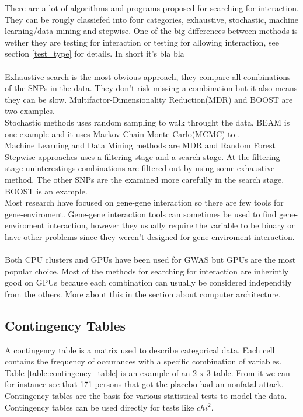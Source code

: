 \documentclass[10pt,a4paper]{article}
\begin{document}
There are a lot of algorithms and programs proposed for searching for interaction. They can be rougly classiefed into four categories, exhaustive, stochastic, machine learning/data mining and stepwise\cite{fast_high_order_cluster}. One of the big differences between methods is wether they are testing for interaction or testing for allowing interaction, see section \ref{test_type} for details. In short it's bla bla\\
\\
Exhaustive search is the most obvious approach, they compare all combinations of the SNPs in the data. They don't risk missing a combination but it also means they can be slow. Multifactor-Dimensionality Reduction(MDR)\cite{mdr_2001} and BOOST\cite{boost_gene_gene} are two examples.
\\
Stochastic methods uses random sampling to walk throught the data. BEAM\cite{beam_2007} is one example and it uses Markov Chain Monte Carlo(MCMC) to .
\\
Machine Learning and Data Mining methods are 
MDR\cite{mdr_2001} and Random Forest\cite{random_jungle}
\\
Stepwise approaches uses a filtering stage and a search stage. At the filtering stage uninterestings combinations are filtered out by using some exhaustive method. The other SNPs are the examined more carefully in the search stage. BOOST\cite{boost_gene_gene} is an example.
\\
Most research have focused on gene-gene interaction so there are few tools for gene-enviroment. Gene-gene interaction tools can sometimes be used to find gene-enviroment interaction, however they usually require the variable to be binary or have other problems since they weren't designed for gene-enviroment interaction\cite{gene_enviroment_2013}.\\
\\
Both CPU clusters\cite{biforce} and GPUs\cite{gwis,gboost,gmdr_gpu,cuda_lr,genie_2012} have been used for GWAS but GPUs are the most popular choice. Most of the methods for searching for interaction are inherintly good on GPUs because each combination can usually be considered independtly from the others. More about this in the section about computer architecture.

\subsection{Contingency Tables}
A contingency table is a matrix used to describe categorical data. Each cell contains the frequency of occurances with a specific combination of variables. Table \ref{table:contingency_table} is an example of an 2 x 3 table. From it we can for instance see that 171 persons that got the placebo had an nonfatal attack. Contingency tables are the basis for various statistical tests to model the data. Contingency tables can be used directly for tests like $chi^2$. \cite{agresti_categorical}
\end{document}
